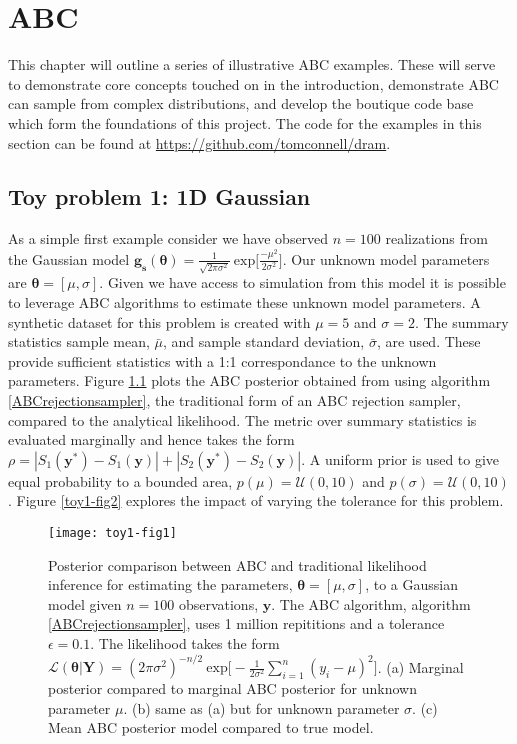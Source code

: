 \chapter{ABC}

This chapter will outline a series of illustrative ABC examples. These will serve to demonstrate core concepts touched on in the introduction, demonstrate ABC can sample from complex distributions, and develop the boutique code base which form the foundations of this project. The code for the examples in this section can be found at \url{https://github.com/tomconnell/dram}.\\

\section{Toy problem 1: 1D Gaussian}
As a simple first example consider we have observed $n = 100$ realizations from the Gaussian model $\bm{g_s}(\bm{\theta}) = \frac{1}{\sqrt{2\pi\sigma^2}}\ \text{exp}\Big[\frac{-\mu^2}{2\sigma^2}\Big]$. Our unknown model parameters are $\bm{\theta} = [\mu,\sigma]$. Given we have access to simulation from this model it is possible to leverage ABC algorithms to estimate these unknown model parameters. A synthetic dataset for this problem is created with $\mu = 5$ and $\sigma = 2$. The summary statistics sample mean, $\bar{\mu}$, and sample standard deviation, $\bar{\sigma}$, are used. These provide sufficient statistics with a 1:1 correspondance to the unknown parameters. Figure \ref{toy1-fig1} plots the ABC posterior obtained from using algorithm \ref{ABCrejectionsampler}, the traditional form of an ABC rejection sampler, compared to the analytical likelihood. The metric over summary statistics is evaluated marginally and hence takes the form $\rho = |S_1(\bm{y^*}) - S_1(\bm{y})| +| S_2(\bm{y^*}) - S_2(\bm{y})|$. A uniform prior is used to give equal probability to a bounded area, $p(\mu) = \mathcal{U}(0,10)$ and $p(\sigma) = \mathcal{U}(0,10)$. 
Figure \ref{toy1-fig2} explores the impact of varying the tolerance for this problem.\\

\begin{figure}[H]
	\centering
	\texttt{[image: toy1-fig1]}
	\caption{Posterior comparison between ABC and traditional likelihood inference for estimating the parameters, $\bm{\theta} = [\mu,\sigma]$, to a Gaussian model given $n = 100$ observations, $\bm{y}$. The ABC algorithm, algorithm \ref{ABCrejectionsampler}, uses 1 million repititions and a tolerance $\epsilon = 0.1$. The likelihood takes the form $\mathcal{L}(\bm{\theta}|\bm{Y}) = (2\pi\sigma^2)^{-n/2}\ \text{exp}\big[-\frac{1}{2\sigma^2}\sum_{i = 1}^{n}(y_i-\mu)^2\big]$. (a) Marginal posterior compared to marginal ABC posterior for unknown parameter $\mu$. (b) same as (a) but for unknown parameter $\sigma$. (c) Mean ABC posterior model compared to true model.}
	\label{toy1-fig1}
\end{figure}

